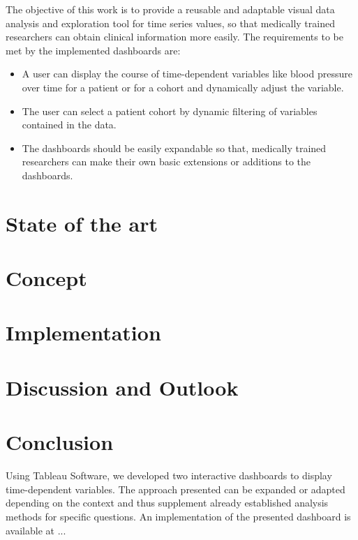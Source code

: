 \documentclass[aac,crcready]{iosart2x}
\begin{document}
The objective of this work is to provide a reusable and adaptable visual data analysis and exploration tool for time series values, so that medically trained researchers can obtain clinical information more easily.
The requirements to be met by the implemented dashboards are:
\begin{itemize}
\item A user can display the course of time-dependent variables like blood pressure over time for a patient or for a cohort and dynamically adjust the variable.
\item The user can select a patient cohort by dynamic filtering of variables contained in the data.
\item The dashboards should be easily expandable so that, medically trained researchers can make their own basic extensions or additions to the dashboards.
\end{itemize}

\section{State of the art}\label{s2}


\section{Concept}\label{s3}


\section{Implementation}\label{s4}

\section{Discussion and Outlook}\label{s5}

\section{Conclusion}\label{s6}
Using Tableau Software, we developed two interactive dashboards to display time-dependent variables. The approach presented can be expanded or adapted depending on the context and thus supplement already established analysis methods for specific questions. An implementation of the presented dashboard is available at ...



\end{document}
